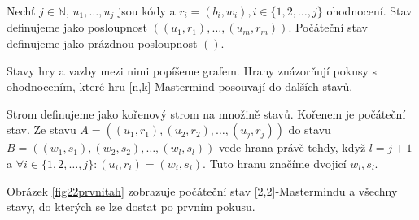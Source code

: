 \begin{definice}[Stav]\label{stav}
   Nechť $j \in \mathbb{N}$, $u_1, \dots , u_j$ jsou kódy a $r_i = (b_i,w_i), i \in \{1,2,\dots,j\}$ ohodnocení. Stav definujeme jako posloupnost $((u_1, r_1), \dots, (u_m, r_m))$. Počáteční stav definujeme jako prázdnou posloupnost $()$.
\end{definice}

Stavy hry a vazby mezi nimi popíšeme grafem. Hrany znázorňují pokusy s ohodnocením, které hru [n,k]-Mastermind posouvají do dalších stavů. 
\begin{definice}
  Strom  definujeme jako kořenový strom na množině stavů. Kořenem je počáteční stav. Ze stavu $A = \left((u_1, r_1), (u_2,r_2), \dots, (u_j,r_j)\right)$ do stavu $B = \left((w_1, s_1), (w_2,s_2), \dots, (w_l,s_l)\right)$ vede hrana právě tehdy, když $l = j+1$ a $\forall i \in \{1,2,\dots, j\} \colon (u_i, r_i) = (w_i, s_i)$. Tuto hranu značíme dvojicí $w_l, s_l$. 
\end{definice}

Obrázek \ref{fig22prvnitah} zobrazuje počáteční stav [2,2]-Mastermindu a všechny stavy, do kterých se lze dostat po prvním pokusu. 


